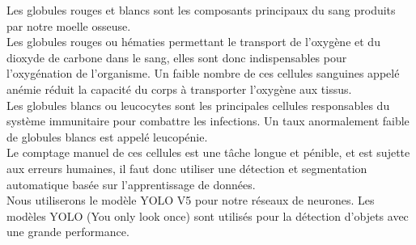 \label{intro}

Les globules rouges et blancs sont les composants principaux du sang produits par notre moelle osseuse.\\
Les globules rouges ou hématies permettant le transport de l’oxygène et du dioxyde de carbone dans le sang, elles sont donc indispensables pour l’oxygénation de l’organisme. Un faible nombre de ces cellules sanguines appelé anémie réduit la capacité du corps à transporter l'oxygène aux tissus.\\
Les globules blancs ou leucocytes sont les principales cellules responsables du système immunitaire pour combattre les infections. Un taux anormalement faible de globules blancs est appelé leucopénie.\\
Le comptage manuel de ces cellules est une tâche longue et pénible, et est sujette aux erreurs humaines, il faut donc utiliser une détection et segmentation automatique basée sur l'apprentissage de données.\\
Nous utiliserons le modèle YOLO V5 pour notre réseaux de neurones. Les modèles YOLO (You only look once) sont utilisés pour la détection d'objets avec une grande performance. 